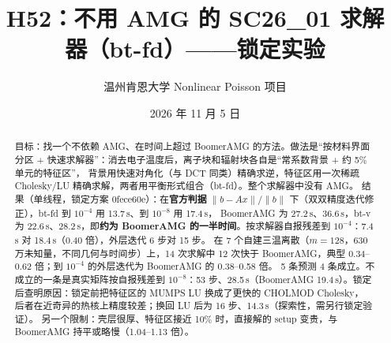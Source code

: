 \documentclass[11pt,a4paper]{ctexart}
\title{H52：不用 AMG 的 SC26\_01 求解器（bt-fd）——锁定实验}
\author{温州肯恩大学 \quad Nonlinear Poisson 项目}
\date{2026 年 11 月 5 日}
\begin{document}
\maketitle

\begin{abstract}
目标：找一个不依赖 AMG、在时间上超过 BoomerAMG 的方法。做法是“按材料界面分区 + 快速求解器”：消去电子温度后，离子块和辐射块各自是“常系数背景 + 约 5\% 单元的特征区”，
背景用快速对角化（与 DCT 同类）精确求逆，特征区用一次稀疏 Cholesky/LU 精确求解，两者用平衡形式组合（bt-fd）。整个求解器中没有 AMG。
结果（单线程，锁定方案 0fece60e）：在\textbf{官方判据} $\|b-Ax\|/\|b\|$ 下（双双精度迭代修正），bt-fd 到 $10^{-4}$ 用 13.7\,s、到 $10^{-8}$ 用 17.4\,s，
BoomerAMG 为 27.2\,s、36.6\,s，bt-v 为 22.6\,s、28.2\,s，即\textbf{约为 BoomerAMG 的一半时间}。按求解器自报残差到 $10^{-4}$：7.4\,s 对 18.4\,s（0.40 倍），外层迭代 6 步对 15 步。
在 7 个自建三温离散（$m=128$，630 万未知量，不同几何与时间步）上，14 次求解中 12 次快于 BoomerAMG，典型 0.34--0.62 倍；到 $10^{-4}$ 的外层迭代为 BoomerAMG 的 0.38--0.58 倍。
5 条预测 4 条成立。不成立的一条是真实矩阵按自报残差到 $10^{-8}$：53 步、28.5\,s（BoomerAMG 19.4\,s）。锁定后查明原因：锁定前把特征区的 MUMPS LU 换成了更快的 CHOLMOD Cholesky，
后者在近奇异的热核上精度较差；换回 LU 后为 16 步、14.3\,s（探索性，需另行锁定验证）。
另一个限制：壳层很厚、特征区接近 10\% 时，直接解的 setup 变贵，与 BoomerAMG 持平或略慢（1.04--1.13 倍）。
\end{abstract}
\end{document}
